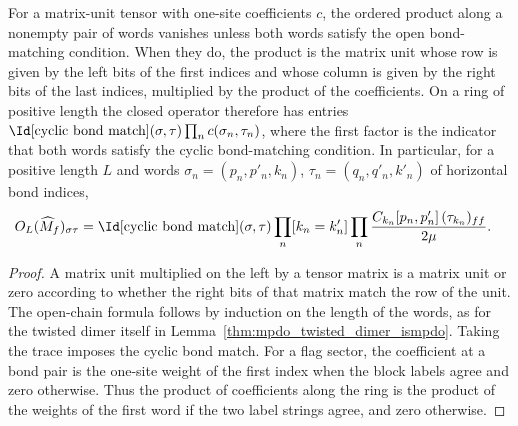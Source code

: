 \begin{lemma}%
    \label{lem:mpdo_twisted_dimer_flag_sector_operators}
    \leanok
    For a matrix-unit tensor with one-site coefficients $c$, the ordered
    product along a nonempty pair of words vanishes unless both words
    satisfy the open bond-matching condition. When they do, the product is
    the matrix unit whose row is given by the left bits of the first indices
    and whose column is given by the right bits of the last indices,
    multiplied by the product of the coefficients. On a ring of positive
    length the closed operator therefore has entries
    $\Id[\text{cyclic bond match}](\sigma,\tau)
        \prod_n c(\sigma_n,\tau_n)$, where the first factor is the indicator
    that both words satisfy the cyclic bond-matching condition.
    In particular, for a positive length $L$ and words
    $\sigma_n=(p_n,p'_n,k_n)$, $\tau_n=(q_n,q'_n,k'_n)$ of
    horizontal bond indices,
    \begin{align}
        O_L(\widehat M_f)_{\sigma\tau}
         & =\Id[\text{cyclic bond match}](\sigma,\tau)
        \prod_n[k_n=k'_n]
        \prod_n\frac{C_{k_n}[p_n,p'_n]\,(\tau_{k_n})_{ff}}{2\mu}.
        \notag
    \end{align}
\end{lemma}
\begin{proof}\leanok
    A matrix unit multiplied on the left by a tensor matrix is a matrix unit
    or zero according to whether the right bits of that matrix match the row
    of the unit. The open-chain formula follows by induction on the length
    of the words, as for the twisted dimer itself in
    Lemma~\ref{thm:mpdo_twisted_dimer_ismpdo}. Taking the trace imposes the
    cyclic bond match. For a flag sector, the coefficient at a bond pair is
    the one-site weight of the first index when the block labels agree and
    zero otherwise. Thus the product of coefficients along the ring is the
    product of the weights of the first word if the two label strings agree,
    and zero otherwise.
\end{proof}

